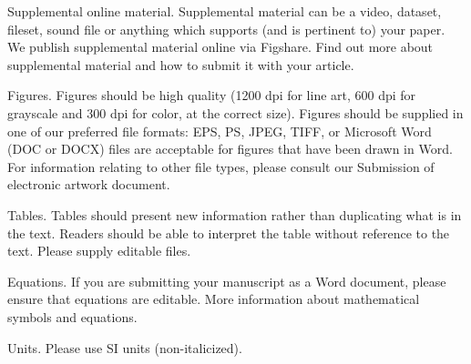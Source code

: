 Supplemental online material. Supplemental material can be a video, dataset, fileset, sound file or anything which supports (and is pertinent to) your paper. We publish supplemental material online via Figshare. Find out more about supplemental material and how to submit it with your article.


Figures. Figures should be high quality (1200 dpi for line art, 600 dpi for grayscale and 300 dpi for color, at the correct size). Figures should be supplied in one of our preferred file formats: EPS, PS, JPEG, TIFF, or Microsoft Word (DOC or DOCX) files are acceptable for figures that have been drawn in Word. For information relating to other file types, please consult our Submission of electronic artwork document.


Tables. Tables should present new information rather than duplicating what is in the text. Readers should be able to interpret the table without reference to the text. Please supply editable files.


Equations. If you are submitting your manuscript as a Word document, please ensure that equations are editable. More information about mathematical symbols and equations.


Units. Please use SI units (non-italicized).